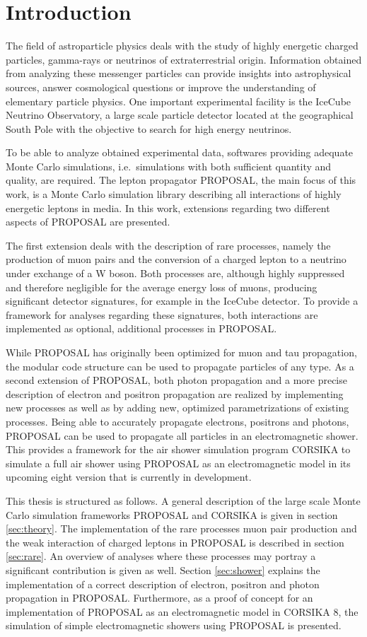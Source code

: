 \chapter{Introduction}

The field of astroparticle physics deals with the study of highly energetic charged particles, gamma-rays or neutrinos of extraterrestrial origin.
Information obtained from analyzing these messenger particles can provide insights into astrophysical sources, answer cosmological questions or improve the understanding of elementary particle physics.
One important experimental facility is the IceCube Neutrino Observatory, a large scale particle detector located at the geographical South Pole with the objective to search for high energy neutrinos.

To be able to analyze obtained experimental data, softwares providing adequate Monte Carlo simulations, i.e.\ simulations with both sufficient quantity and quality, are required. 
The lepton propagator PROPOSAL, the main focus of this work, is a Monte Carlo simulation library describing all interactions of highly energetic leptons in media.
In this work, extensions regarding two different aspects of PROPOSAL are presented.

The first extension deals with the description of rare processes, namely the production of muon pairs and the conversion of a charged lepton to a neutrino under exchange of a W boson.
Both processes are, although highly suppressed and therefore negligible for the average energy loss of muons, producing significant detector signatures, for example in the IceCube detector.
To provide a framework for analyses regarding these signatures, both interactions are implemented as optional, additional processes in PROPOSAL.

While PROPOSAL has originally been optimized for muon and tau propagation, the modular code structure can be used to propagate particles of any type.
As a second extension of PROPOSAL, both photon propagation and a more precise description of electron and positron propagation are realized by implementing new processes as well as by adding new, optimized parametrizations of existing processes.
Being able to accurately propagate electrons, positrons and photons, PROPOSAL can be used to propagate all particles in an electromagnetic shower.
This provides a framework for the air shower simulation program CORSIKA to simulate a full air shower using PROPOSAL as an electromagnetic model in its upcoming eight version that is currently in development.

This thesis is structured as follows.
A general description of the large scale Monte Carlo simulation frameworks PROPOSAL and CORSIKA is given in section \ref{sec:theory}.
The implementation of the rare processes muon pair production and the weak interaction of charged leptons in PROPOSAL is described in section \ref{sec:rare}.
An overview of analyses where these processes may portray a significant contribution is given as well.
Section \ref{sec:shower} explains the implementation of a correct description of electron, positron and photon propagation in PROPOSAL.
Furthermore, as a proof of concept for an implementation of PROPOSAL as an electromagnetic model in CORSIKA 8, the simulation of simple electromagnetic showers using PROPOSAL is presented.   
